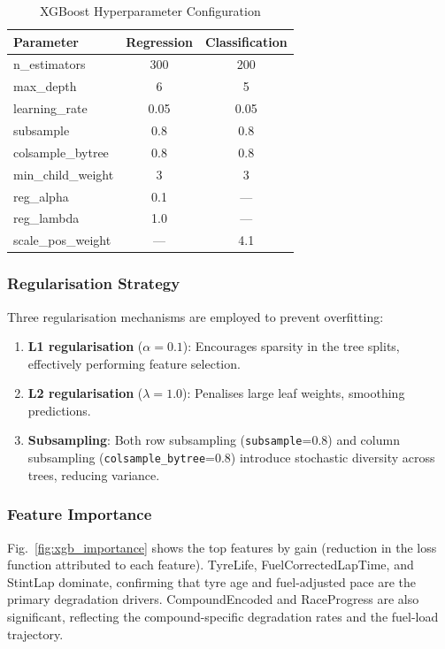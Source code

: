 \documentclass[journal,twoside]{IEEEtran}
\begin{document}
\begin{table}[!t]
\caption{XGBoost Hyperparameter Configuration}
\label{tab:xgb_params}
\centering
\footnotesize
\begin{tabular}{@{}lcc@{}}
\toprule
\textbf{Parameter} & \textbf{Regression} & \textbf{Classification} \\
\midrule
n\_estimators     & 300  & 200  \\
max\_depth        & 6    & 5    \\
learning\_rate    & 0.05 & 0.05 \\
subsample         & 0.8  & 0.8  \\
colsample\_bytree & 0.8  & 0.8  \\
min\_child\_weight& 3    & 3    \\
reg\_alpha        & 0.1  & ---  \\
reg\_lambda       & 1.0  & ---  \\
scale\_pos\_weight& ---  & 4.1  \\
\bottomrule
\end{tabular}
\end{table}

\subsubsection{Regularisation Strategy}

Three regularisation mechanisms are employed to prevent overfitting:

\begin{enumerate}[noitemsep]
  \item \textbf{L1 regularisation} ($\alpha = 0.1$): Encourages
  sparsity in the tree splits, effectively performing feature selection.
  \item \textbf{L2 regularisation} ($\lambda = 1.0$): Penalises large
  leaf weights, smoothing predictions.
  \item \textbf{Subsampling}: Both row subsampling
  (\texttt{subsample}=0.8) and column subsampling
  (\texttt{colsample\_bytree}=0.8) introduce stochastic diversity
  across trees, reducing variance.
\end{enumerate}

\subsubsection{Feature Importance}

Fig.~\ref{fig:xgb_importance} shows the top features by gain
(reduction in the loss function attributed to each feature).
TyreLife, FuelCorrectedLapTime, and StintLap dominate, confirming
that tyre age and fuel-adjusted pace are the primary degradation
drivers.  CompoundEncoded and RaceProgress are also significant,
reflecting the compound-specific degradation rates and the fuel-load
trajectory.
\end{document}
